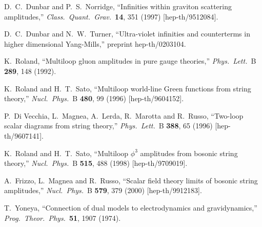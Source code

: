 \begin{thebibliography}{99}
D.~C.~Dunbar and P.~S.~Norridge,
``Infinities within graviton scattering amplitudes,''
{\it Class.\ Quant.\ Grav.}\  {\bf 14}, 351 (1997)
[hep-th/9512084].

D.~C.~Dunbar and N.~W.~Turner,
``Ultra-violet infinities and counterterms in higher dimensional Yang-Mills,''
preprint hep-th/0203104.

K.~Roland,
``Multiloop gluon amplitudes in pure gauge theories,''
{\it Phys.\ Lett.}\ B {\bf 289}, 148 (1992).

K.~Roland and H.~T.~Sato,
``Multiloop world-line Green functions from string theory,''
{\it Nucl.\ Phys.}\ B {\bf 480}, 99 (1996)
[hep-th/9604152].

P.~Di Vecchia, L.~Magnea, A.~Lerda, R.~Marotta and R.~Russo,
``Two-loop scalar diagrams from string theory,''
{\it Phys.\ Lett.}\ B {\bf 388}, 65 (1996)
[hep-th/9607141].

K.~Roland and H.~T.~Sato,
``Multiloop $\phi^3$ amplitudes from bosonic string theory,''
{\it Nucl.\ Phys.}\ B {\bf 515}, 488 (1998)
[hep-th/9709019].

A.~Frizzo, L.~Magnea and R.~Russo,
``Scalar field theory limits of bosonic string amplitudes,''
{\it Nucl.\ Phys.}\ B {\bf 579}, 379 (2000)
[hep-th/9912183].

T.~Yoneya,
``Connection of dual models to electrodynamics and gravidynamics,''
{\it Prog.\ Theor.\ Phys.}\  {\bf 51}, 1907 (1974).


\end{thebibliography}
